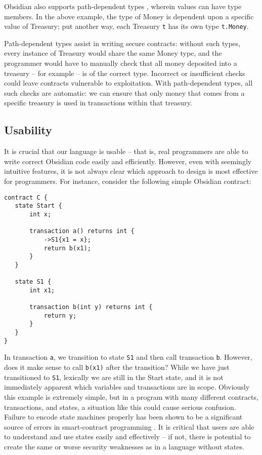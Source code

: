 \documentclass[sigplan,10pt,review]{acmart}\settopmatter{printfolios=true}
\begin{document}
Obsidian also supports path-dependent types \cite{Amin}, wherein values can have type members. In the 
above example, the type of Money is dependent upon a specific value of Treasury; put another way, 
each Treasury \texttt{\small{t}} has its own type \texttt{\small{t.Money}}. 

Path-dependent types assist in writing secure contracts: without such types, every instance of 
Treasury would share the same Money type, and the programmer would have to manually check 
that all money deposited into a treasury -- for example -- is of the correct type. Incorrect or insufficient 
checks could leave contracts vulnerable to exploitation. With path-dependent types, all such checks 
are automatic: we can ensure that only money that comes from a specific treasury is used in 
transactions within that treasury. 

\subsection{Usability}
It is crucial that our language is usable -- that is, real programmers are able to write correct Obsidian 
code easily and efficiently. However, even with seemingly intuitive features, it is not always clear 
which approach to design is most effective for programmers. For instance, consider the following simple 
Obsidian contract:

\begin{lstlisting}
contract C {
   state Start {
       int x;
  
       transaction a() returns int {
           ->S1{x1 = x};
           return b(x1);
       }
   }
  
   state S1 {
       int x1;
      
       transaction b(int y) returns int {
           return y;
       }
   }
}
\end{lstlisting}

In transaction \texttt{\small{a}}, we transition to state \texttt{\small{S1}} and then call transaction \texttt{\small{b}}. 
However, does it make sense to call \texttt{\small{b(x1)}} after the transition? While we have just 
transitioned to \texttt{\small{S1}}, lexically we are still in the 
Start state, and it is not immediately apparent which variables and transactions are in scope. 
Obviously this example is extremely simple, but in a program with many different contracts, 
transactions, and states, a situation like this could cause serious confusion. Failure to encode state 
machines properly has been shown to be a significant source of errors in smart-contract 
programming \cite{Delmolino}. It is critical that users are able to understand and use states easily and 
effectively -- if not, there is potential to create the same or worse security weaknesses as in a 
language without states. 
\end{document}
